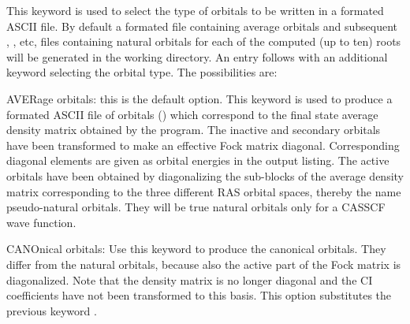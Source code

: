 \begin{keywordlist}

This keyword is used to select the type of orbitals to be written
in a formated ASCII file. By default a formated  file
containing average orbitals and subsequent ,
, etc, files containing natural orbitals for each
of the computed (up to ten) roots will be generated in the working directory.
An entry follows with an additional keyword selecting the orbital type.
The possibilities are:

AVERage orbitals: this is the default option.
This keyword is used to produce a formated ASCII file of orbitals
() which correspond to the final state average density matrix obtained by
the  program. The inactive and
secondary orbitals have been transformed to make an effective Fock
matrix diagonal. Corresponding diagonal elements are given as orbital
energies in the  output listing. The active orbitals have been
obtained by diagonalizing the sub-{}blocks of the average density matrix
corresponding to the three different RAS orbital spaces, thereby
the name pseudo-{}natural orbitals. They will be true natural orbitals
only for a CASSCF wave function.

CANOnical orbitals:
Use this keyword to produce the canonical orbitals. They differ from
the natural orbitals, because also the active part of the Fock matrix is
diagonalized. Note that the density matrix is no longer diagonal and
the CI coefficients have not been transformed to this basis.
This option substitutes the previous keyword .


\end{keywordlist}
